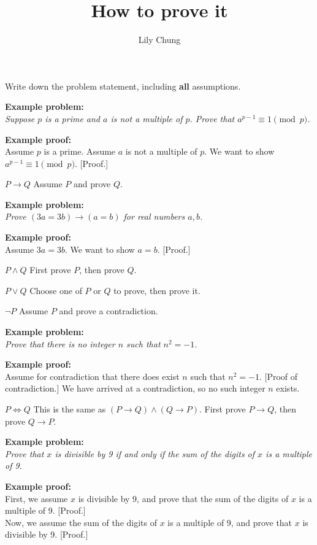 \documentclass{article}
\title{How to prove it}
\author{Lily Chung}
\date{}
\newcommand{\example}[2]{
  \begin{minipage}[t]{\textwidth/2-1em}   
    \textbf{Example problem:}\\
    \itshape
    {#1}
  \end{minipage}\hfill
  \begin{minipage}[t]{\textwidth/2-1em}
    \textbf{Example proof:}\\
    {#2}
  \end{minipage}
}
\begin{document}
\maketitle

\begin{tcolorbox}[title=Start]
  Write down the problem statement, including \textbf{all} assumptions.
  \\[1em]
  \example{
    Suppose $p$ is a prime and $a$ is not a
    multiple of $p$. Prove that $a^{p-1} \equiv 1 \pmod p$.
  }{
    Assume $p$ is a prime.
    Assume $a$ is not a multiple of $p$.
    We want to show $a^{p-1} \equiv 1 \pmod p$. [Proof.]
  }
\end{tcolorbox}

\begin{logicbox}{$P \to Q$}
  Assume $P$ and prove $Q$.
  \\[1em]
  \example{
    Prove $(3a = 3b) \to (a = b)$ for real numbers $a, b$.
  }{
    Assume $3a = 3b$.
    We want to show $a = b$. [Proof.]
  }
\end{logicbox}

\begin{logicbox}{$P \land Q$}
  First prove $P$, then prove $Q$.
\end{logicbox}

\begin{logicbox}{$P \lor Q$}
  Choose one of $P$ or $Q$ to prove, then prove it.
\end{logicbox}

\begin{logicbox}{$\neg P$}
  Assume $P$ and prove a contradiction.
  \\[1em]
  \example{
    Prove that there is no integer $n$ such that $n^2 = -1$.
  }{
    Assume for contradiction that there does exist $n$ such that $n^2 = -1$.
    [Proof of contradiction.]
    We have arrived at a contradiction, so no such integer $n$ exists.
  }
\end{logicbox}

\begin{logicbox}{$P \iff Q$}
  This is the same as $(P \to Q) \land (Q \to P)$.
  First prove $P \to Q$, then prove $Q \to P$.
  \\[1em]
  \example{
    Prove that $x$ is divisible by 9 if and
only if the sum of the digits of $x$ is a multiple of 9.
  }{
    First, we assume $x$ is divisible by 9, and prove that
    the sum of the digits of $x$ is a multiple of 9.
    [Proof.]
    \\[0.5em]
    Now, we assume the sum of the digits of $x$ is a multiple of 9,
    and prove that $x$ is divisible by 9. [Proof.]
  }
\end{logicbox}
\end{document}

